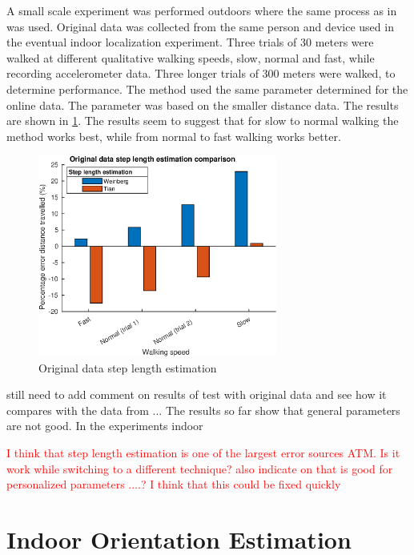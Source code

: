 A small scale experiment was performed outdoors where the same process as in \cite{Vezocnik2019} was used. Original data was collected from the same person and device used in the eventual indoor localization experiment. Three trials of 30 meters were walked at different qualitative walking speeds, slow, normal and fast, while recording accelerometer data. Three longer trials of 300 meters were walked, to determine performance. The \citet{Tian2016} method used the same parameter determined for the online data. The \citet{Weinberg2002} parameter was based on the smaller distance data. The results are shown in \cref{fig:step_length_personal_testing}. The results seem to suggest that for slow to normal walking the \citet{Tian2016} method works best, while from normal to fast walking \citet{Weinberg2002} works better. 
\begin{figure}[H]
	\centering
	\includegraphics[width=0.7\textwidth]{images/20201113_1920_wienberg_vs_tian_og_data_1}
	\caption{Original data step length estimation \\ }
	\label{fig:step_length_personal_testing}
\end{figure}

{\color{cyan} still need to add comment on results of test with original data and see how it compares with the data from \cite{Vezocnik2019}... The results so far show that general parameters are not good. In the experiments indoor }

\textcolor{red}{I think that step length estimation is one of the largest error sources ATM. Is it work while switching to a different technique? \citet{Vezocnik2019} also indicate on that is good for personalized parameters ....? I think that this could be fixed quickly}

\section{Indoor Orientation Estimation}

